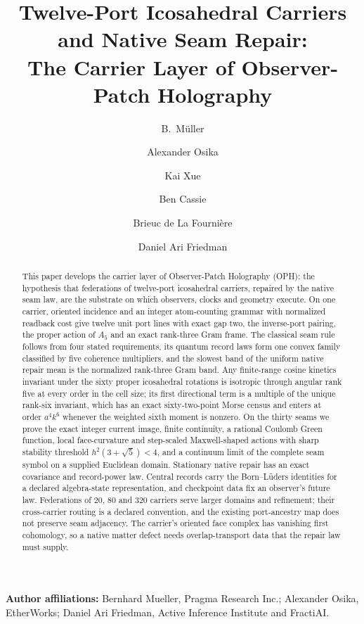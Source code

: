 \documentclass[11pt]{article}
\title{Twelve-Port Icosahedral Carriers and Native Seam Repair:\\
The Carrier Layer of Observer-Patch Holography}
\author{B.\ M\"uller \and Alexander Osika \and Kai Xue \and Ben Cassie
\and Brieuc de La Fourni\`ere \and Daniel Ari Friedman}
\date{\OPHPaperReleaseDate}
\theoremstyle{remark}
\theoremstyle{plain}
\begin{document}
\maketitle
\OPHPaperReleaseBanner

\begin{center}
\small\textbf{Author affiliations:} Bernhard Mueller, Pragma Research Inc.; Alexander Osika, EtherWorks; Daniel Ari Friedman, Active Inference Institute and FractiAI.
\end{center}

\begin{abstract}
This paper develops the carrier layer of Observer-Patch Holography (OPH):
the hypothesis that federations of twelve-port icosahedral carriers,
repaired by the native seam law, are the substrate on which observers,
clocks and geometry execute. On one carrier, oriented incidence and an
integer atom-counting grammar with normalized readback cost give twelve
unit port lines with exact gap two, the inverse-port pairing, the proper
action of \(A_5\) and an exact rank-three Gram frame. The classical seam
rule follows from four stated requirements, its quantum record laws form
one convex family classified by five coherence multipliers, and the
slowest band of the uniform native repair mean is the normalized
rank-three Gram band. Any finite-range cosine kinetics invariant under the
sixty proper icosahedral rotations is isotropic through angular rank five
at every order in the cell size; its first directional term is a multiple
of the unique rank-six invariant, which has an exact sixty-two-point Morse
census and enters at order \(a^4k^6\) whenever the weighted sixth moment is
nonzero. On the thirty seams we prove the exact integer current image,
finite continuity, a rational Coulomb Green function, local face-curvature
and step-scaled Maxwell-shaped actions with sharp stability threshold
\(h^2(3+\sqrt5)<4\), and a continuum limit of the complete seam symbol on a
supplied Euclidean domain. Stationary native repair has an exact covariance
and record-power law. Central records carry the Born--L\"uders identities
for a declared algebra-state representation, and checkpoint data fix an
observer's future law. Federations of \(20\), \(80\) and \(320\) carriers
serve larger domains and refinement; their cross-carrier routing is a
declared convention, and the existing port-ancestry map does not preserve
seam adjacency. The carrier's oriented face complex has vanishing first
cohomology, so a native matter defect needs overlap-transport data that
the repair law must supply.
\end{abstract}
\end{document}
